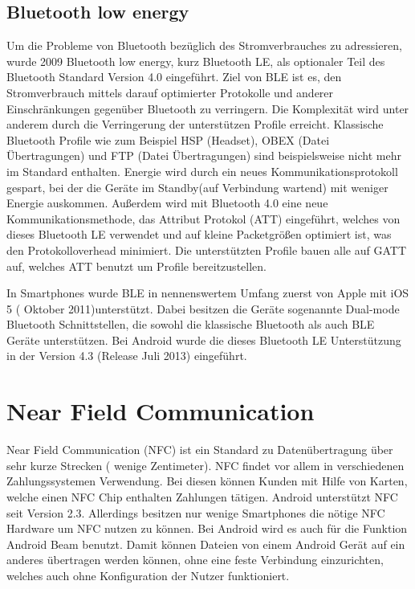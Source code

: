 \documentclass[12pt,journal,compsoc]{IEEEtran}
\begin{document}
\subsection{Bluetooth low energy}
Um die Probleme von Bluetooth bezüglich des Stromverbrauches zu adressieren, wurde 2009 Bluetooth low energy, kurz Bluetooth LE, als optionaler Teil des Bluetooth Standard Version 4.0 eingeführt.  
Ziel von BLE ist es, den Stromverbrauch mittels darauf optimierter Protokolle und anderer Einschränkungen gegenüber Bluetooth zu verringern.
Die Komplexität wird unter anderem durch die Verringerung der unterstützen Profile erreicht. Klassische Bluetooth Profile wie zum Beispiel HSP (Headset), OBEX (Datei Übertragungen) und FTP (Datei Übertragungen) sind beispielsweise nicht mehr im Standard enthalten.
Energie wird durch ein neues Kommunikationsprotokoll gespart, bei der die Geräte im Standby(auf Verbindung wartend) mit weniger Energie auskommen.
Außerdem wird mit Bluetooth 4.0 eine neue Kommunikationsmethode, das Attribut Protokol (ATT) eingeführt, welches von dieses Bluetooth LE verwendet und auf kleine Packetgrößen optimiert ist, was den Protokolloverhead minimiert.
Die unterstützten Profile bauen alle auf GATT auf, welches ATT benutzt um Profile bereitzustellen.


In Smartphones wurde BLE in nennenswertem Umfang zuerst von Apple mit iOS 5 ( Oktober 2011)unterstützt.
Dabei besitzen die Geräte sogenannte Dual-mode Bluetooth Schnittstellen, die sowohl die klassische Bluetooth als auch BLE Geräte unterstützen.
Bei Android wurde die dieses Bluetooth LE Unterstützung in der Version 4.3 (Release Juli 2013) eingeführt.


\section{Near Field Communication}
Near Field Communication (NFC) ist ein Standard zu Datenübertragung über sehr kurze Strecken ( wenige Zentimeter). 
NFC findet vor allem in verschiedenen Zahlungssystemen Verwendung.
Bei diesen können Kunden mit Hilfe von Karten, welche einen NFC Chip enthalten Zahlungen tätigen.
Android unterstützt NFC seit Version 2.3. Allerdings besitzen nur wenige Smartphones die nötige NFC Hardware um NFC nutzen zu können.
Bei Android wird es auch für die Funktion Android Beam benutzt. 
Damit können Dateien von einem Android Gerät auf ein anderes übertragen werden können, ohne eine feste Verbindung einzurichten, welches auch ohne Konfiguration der Nutzer funktioniert.
\end{document}
